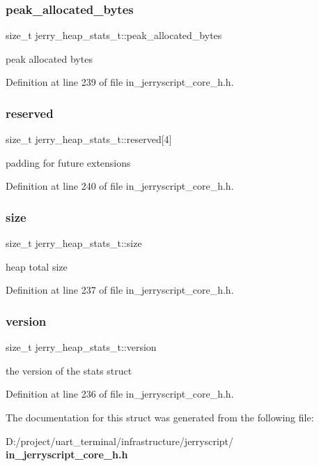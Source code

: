 \mbox{\label{structjerry__heap__stats__t_a40f428cf632a28d459999cc229fe4faa}} 
\subsubsection{peak\_allocated\_bytes}
{\footnotesize\ttfamily size\+\_\+t jerry\+\_\+heap\+\_\+stats\+\_\+t\+::peak\+\_\+allocated\+\_\+bytes}

peak allocated bytes 

Definition at line 239 of file in\+\_\+jerryscript\+\_\+core\+\_\+h.\+h.

\mbox{\label{structjerry__heap__stats__t_ad1331b6bce210fb628cc46cb24e1b597}} 
\subsubsection{reserved}
{\footnotesize\ttfamily size\+\_\+t jerry\+\_\+heap\+\_\+stats\+\_\+t\+::reserved[4]}

padding for future extensions 

Definition at line 240 of file in\+\_\+jerryscript\+\_\+core\+\_\+h.\+h.

\mbox{\label{structjerry__heap__stats__t_a26856560d8139c2bae0e49c44bfe1b4b}} 
\subsubsection{size}
{\footnotesize\ttfamily size\+\_\+t jerry\+\_\+heap\+\_\+stats\+\_\+t\+::size}

heap total size 

Definition at line 237 of file in\+\_\+jerryscript\+\_\+core\+\_\+h.\+h.

\mbox{\label{structjerry__heap__stats__t_a7a3c7ae14c9800e62de19b0d060b4d6b}} 
\subsubsection{version}
{\footnotesize\ttfamily size\+\_\+t jerry\+\_\+heap\+\_\+stats\+\_\+t\+::version}

the version of the stats struct 

Definition at line 236 of file in\+\_\+jerryscript\+\_\+core\+\_\+h.\+h.



The documentation for this struct was generated from the following file\+:\begin{DoxyCompactItemize}
\item 
D\+:/project/uart\+\_\+terminal/infrastructure/jerryscript/\textbf{ in\+\_\+jerryscript\+\_\+core\+\_\+h.\+h}\end{DoxyCompactItemize}
